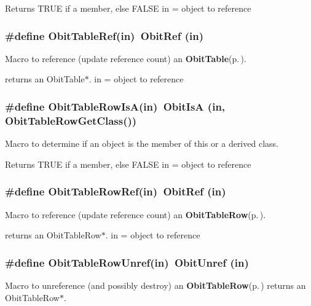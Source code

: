 Returns TRUE if a member, else FALSE in = object to reference 
\subsubsection{\setlength{\rightskip}{0pt plus 5cm}\#define Obit\-Table\-Ref(in)\ Obit\-Ref (in)}\label{ObitTable_8h_a1}


Macro to reference (update reference count) an {\bf Obit\-Table}{\rm (p.\,\pageref{structObitTable})}. 

returns an Obit\-Table$\ast$. in = object to reference 
\subsubsection{\setlength{\rightskip}{0pt plus 5cm}\#define Obit\-Table\-Row\-Is\-A(in)\ Obit\-Is\-A (in, Obit\-Table\-Row\-Get\-Class())}\label{ObitTable_8h_a5}


Macro to determine if an object is the member of this or a derived class. 

Returns TRUE if a member, else FALSE in = object to reference 
\subsubsection{\setlength{\rightskip}{0pt plus 5cm}\#define Obit\-Table\-Row\-Ref(in)\ Obit\-Ref (in)}\label{ObitTable_8h_a4}


Macro to reference (update reference count) an {\bf Obit\-Table\-Row}{\rm (p.\,\pageref{structObitTableRow})}. 

returns an Obit\-Table\-Row$\ast$. in = object to reference 
\subsubsection{\setlength{\rightskip}{0pt plus 5cm}\#define Obit\-Table\-Row\-Unref(in)\ Obit\-Unref (in)}\label{ObitTable_8h_a3}


Macro to unreference (and possibly destroy) an {\bf Obit\-Table\-Row}{\rm (p.\,\pageref{structObitTableRow})} returns an Obit\-Table\-Row$\ast$. 

